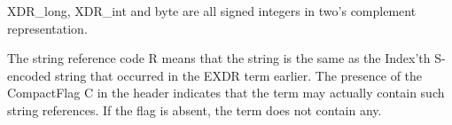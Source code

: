 XDR_long, XDR_int and byte are all signed integers in two's complement
representation.

The string reference code R means that the string is the same as the
Index'th S-encoded string that occurred in the EXDR term earlier.
The presence of the CompactFlag C in the header indicates that the term
may actually contain such string references. If the flag is absent, the
term does not contain any.

